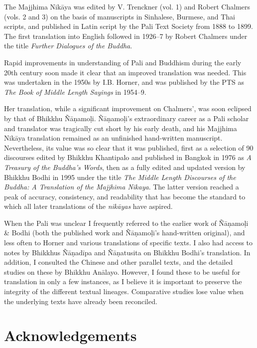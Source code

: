 \documentclass[12pt,openany]{book}%
\begin{document}
The Majjhima \textsanskrit{Nikāya} was edited by V. Trenckner (vol. 1) and Robert Chalmers (vols. 2 and 3) on the basis of manuscripts in Sinhalese, Burmese, and Thai scripts, and published in Latin script by the Pali Text Society from 1888 to 1899. The first translation into English followed in 1926–7 by Robert Chalmers under the title \textit{Further Dialogues of the Buddha}.

Rapid improvements in understanding of Pali and Buddhism during the early 20th century soon made it clear that an improved translation was needed. This was undertaken in the 1950s by I.B. Horner, and was published by the PTS as \textit{The Book of Middle Length Sayings} in 1954–9.

Her translation, while a significant improvement on Chalmers’, was soon eclipsed by that of Bhikkhu \textsanskrit{Ñāṇamoḷi}. \textsanskrit{Ñāṇamoḷi}’s extraordinary career as a Pali scholar and translator was tragically cut short by his early death, and his Majjhima \textsanskrit{Nikāya} translation remained as an unfinished hand-written manuscript. Nevertheless, its value was so clear that it was published, first as a selection of 90 discourses edited by Bhikkhu Khantipalo and published in Bangkok in 1976 as \textit{A Treasury of the Buddha’s Words}, then as a fully edited and updated version by Bhikkhu Bodhi in 1995 under the title \textit{The Middle Length Discourses of the Buddha: A Translation of the Majjhima Nikaya}. The latter version reached a peak of accuracy, consistency, and readability that has become the standard to which all later translations of the \textit{\textsanskrit{nikāyas}} have aspired.

When the Pali was unclear I frequently referred to the earlier work of \textsanskrit{Ñāṇamoḷi} \& Bodhi (both the published work and \textsanskrit{Ñāṇamoḷi}’s hand-written original), and less often to Horner and various translations of specific texts. I also had access to notes by Bhikkhus \textsanskrit{Ñāṇadīpa} and \textsanskrit{Ñāṇatusita} on Bhikkhu Bodhi’s translation. In addition, I consulted the Chinese and other parallel texts, and the detailed studies on these by Bhikkhu \textsanskrit{Anālayo}. However, I found these to be useful for translation in only a few instances, as I believe it is important to preserve the integrity of the different textual lineages. Comparative studies lose value when the underlying texts have already been reconciled.

%
\chapter*{Acknowledgements}
\end{document}
